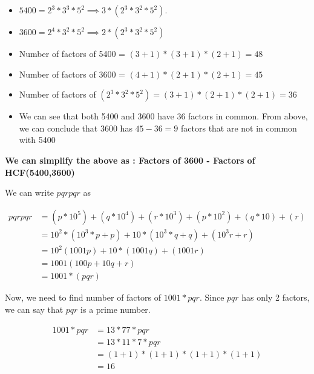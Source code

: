 
\begin{itemize}
    \item $5400 = 2^3 * 3^3 * 5^2 \implies 3 * (2^3 * 3^2 * 5^2) $. 
    \item $3600 = 2^4 * 3^2 * 5^2 \implies 2 * (2^3 * 3^2 * 5^2) $
    \item Number of factors of 5400 = $(3+1) * (3+1) * (2+1) = 48$
    \item Number of factors of 3600 = $(4+1) * (2+1) * (2+1) = 45$
    \item Number of factors of $(2^3 * 3^2 * 5^2) = (3+1) * (2+1) * (2+1) = 36$
    \item We can see that both 5400 and 3600 have 36 factors in common. From above, we can conclude that 3600 has $45 - 36 = 9$ factors that are not in common with 5400
\end{itemize}

\textbf{We can simplify the above as : Factors of 3600 - Factors of HCF(5400,3600)}


We can write $pqrpqr$ as 

\begin{align*}
    pqrpqr &= (p * 10^5) + (q * 10^4) + (r * 10^3) + (p * 10^2) + (q * 10) + (r) \\
    &= 10^2 * (10^3 * p + p) + 10 * (10^3 * q + q) + (10^3 r + r) \\
    &= 10^2 (1001p) + 10 * (1001q) + (1001r) \\
    &= 1001 (100p + 10q + r) \\
    &= 1001 * (pqr) \tag{$pqr$ is a 3 digit number}
\end{align*}

Now, we need to find number of factors of $1001 * pqr$. Since $pqr$ has only 2 factors, we can say that $pqr$ is a prime number. 

\begin{align*}
    1001 * pqr &= 13 * 77 * pqr \\
    &= 13 * 11 * 7 * pqr \\
    &= (1+1) * (1+1) * (1+1) * (1+1) \\
    &= 16
\end{align*}

